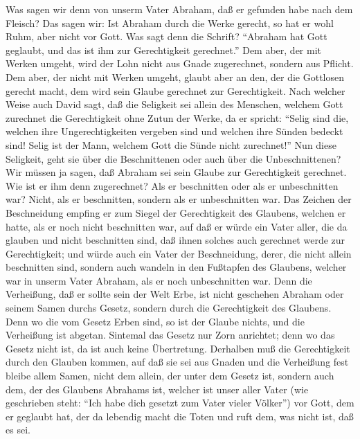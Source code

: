  Was sagen wir denn von unserm Vater Abraham, daß er
gefunden habe nach dem Fleisch?  Das sagen wir: Ist Abraham
durch die Werke gerecht, so hat er wohl Ruhm, aber nicht vor Gott.
 Was sagt denn die Schrift? ``Abraham hat Gott geglaubt, und
das ist ihm zur Gerechtigkeit gerechnet.''  Dem aber, der
mit Werken umgeht, wird der Lohn nicht aus Gnade zugerechnet, sondern
aus Pflicht.  Dem aber, der nicht mit Werken umgeht, glaubt
aber an den, der die Gottlosen gerecht macht, dem wird sein Glaube
gerechnet zur Gerechtigkeit.  Nach welcher Weise auch David
sagt, daß die Seligkeit sei allein des Menschen, welchem Gott zurechnet
die Gerechtigkeit ohne Zutun der Werke, da er spricht: 
``Selig sind die, welchen ihre Ungerechtigkeiten vergeben sind und
welchen ihre Sünden bedeckt sind!  Selig ist der Mann,
welchem Gott die Sünde nicht zurechnet!''  Nun diese
Seligkeit, geht sie über die Beschnittenen oder auch über die
Unbeschnittenen? Wir müssen ja sagen, daß Abraham sei sein Glaube zur
Gerechtigkeit gerechnet.  Wie ist er ihm denn zugerechnet?
Als er beschnitten oder als er unbeschnitten war? Nicht, als er
beschnitten, sondern als er unbeschnitten war.  Das Zeichen
der Beschneidung empfing er zum Siegel der Gerechtigkeit des Glaubens,
welchen er hatte, als er noch nicht beschnitten war, auf daß er würde
ein Vater aller, die da glauben und nicht beschnitten sind, daß ihnen
solches auch gerechnet werde zur Gerechtigkeit;  und würde
auch ein Vater der Beschneidung, derer, die nicht allein beschnitten
sind, sondern auch wandeln in den Fußtapfen des Glaubens, welcher war in
unserm Vater Abraham, als er noch unbeschnitten war.  Denn
die Verheißung, daß er sollte sein der Welt Erbe, ist nicht geschehen
Abraham oder seinem Samen durchs Gesetz, sondern durch die Gerechtigkeit
des Glaubens.  Denn wo die vom Gesetz Erben sind, so ist
der Glaube nichts, und die Verheißung ist abgetan. 
Sintemal das Gesetz nur Zorn anrichtet; denn wo das Gesetz nicht ist, da
ist auch keine Übertretung.  Derhalben muß die
Gerechtigkeit durch den Glauben kommen, auf daß sie sei aus Gnaden und
die Verheißung fest bleibe allem Samen, nicht dem allein, der unter dem
Gesetz ist, sondern auch dem, der des Glaubens Abrahams ist, welcher ist
unser aller Vater  (wie geschrieben steht: ``Ich habe dich
gesetzt zum Vater vieler Völker'') vor Gott, dem er geglaubt hat, der da
lebendig macht die Toten und ruft dem, was nicht ist, daß es sei.
